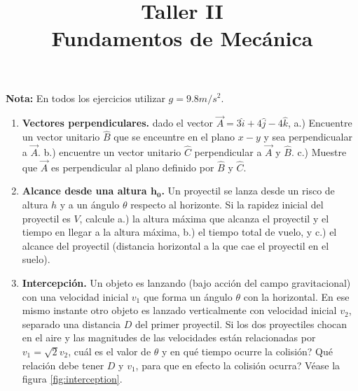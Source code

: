 \documentclass[11pt,letterpaper]{article}
\title{\textbf{Taller II} \\ Fundamentos de Mecánica}
\begin{document}
	\maketitle
	
	\begin{multicols}{2}

	\textbf{Nota:} En todos los ejercicios utilizar $g = 9.8 m/s^2$.
	
	\begin{enumerate}
		
		
		\item \textbf{Vectores perpendiculares.} dado el vector  $\vec{A} = 3 \hat{i} + 4\hat{j} - 4\hat{k}$, a.) Encuentre un vector unitario $\hat{B}$ que se enceuntre en el plano $x-y$ y sea perpendicualar a $\vec{A}$. b.) encuentre un vector unitario $\hat{C}$ perpendicular a $\vec{A}$ y $\hat{B}$. c.) Muestre que $\vec{A}$ es perpendicular al plano definido por $\hat{B}$ y $\hat{C}$.

		\item \textbf{Alcance desde una altura $\mathbf{h_0}$.} Un proyectil se lanza desde un risco de altura $h$ y a un ángulo $\theta$ respecto al horizonte. Si la rapidez inicial del proyectil es $V$, calcule a.) la altura máxima que alcanza el proyectil y el tiempo en llegar a la altura máxima, b.) el tiempo total de vuelo, y c.) el alcance del proyectil (distancia horizontal a la que cae el proyectil en el suelo). 
		
		\item \textbf{Intercepción.} Un objeto es lanzando (bajo acción del campo gravitacional) con una velocidad inicial $v_1$ que forma un ángulo $\theta$ con la horizontal. En ese mismo instante otro objeto es lanzado verticalmente con velocidad inicial $v_2$, separado una distancia $D$ del primer proyectil. Si los dos proyectiles chocan en el aire y las magnitudes de las velocidades están relacionadas por $v_1 = \sqrt{2}v_2$, \textquestiondown cuál es el valor de $\theta$ y en qué tiempo ocurre la colisión? \textquestiondown Qué relación debe tener $D$ y $v_1$, para que en efecto la colisión ocurra? Véase la figura \ref{fig:interception}.
		

\end{enumerate}
\end{multicols}
\end{document}
